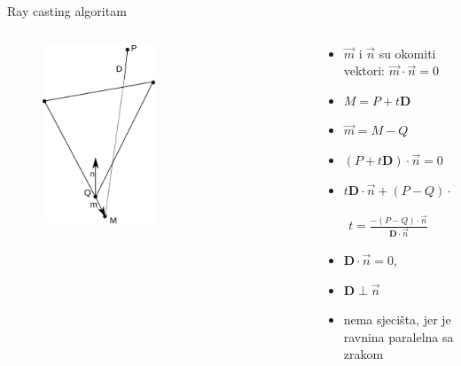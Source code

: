 \documentclass[9pt]{beamer}
\begin{document}
\begin{frame}{Ray casting algoritam}
\begin{columns}
	\begin{column}{0.5\textwidth}
		\begin{figure}
			\includegraphics[width=0.5\textwidth]{./slike/trokut.png}
		\end{figure}
	\end{column}
	\begin{column}{0.5\textwidth}  %
		\begin{itemize}
			\item $\vec{m}$ i $\vec{n}$ su okomiti vektori: $\vec{m}\cdot\vec{n}=0$
			\item $M = P+t\textbf{D}$
			\item $\vec{m} = M-Q$
			\item $\left(P+t\textbf{D}\right)\cdot \vec{n}=0$
			\item $t\textbf{D}\cdot\vec{n} + \left(P-Q\right)\cdot \vec{n}=0$
		\end{itemize}
		\begin{align*}
		t = \frac{-\left(P-Q\right)\cdot\vec{n}}{\textbf{D}\cdot \vec{n}}
		\end{align*}
		\begin{itemize}
			\item $\textbf{D}\cdot \vec{n}=0$, 
			\item $\textbf{D} \perp \vec{n}$
			\item nema sjecišta, jer je ravnina paralelna sa zrakom
		\end{itemize}
	\end{column}
\end{columns}
\end{frame}
\end{document}
